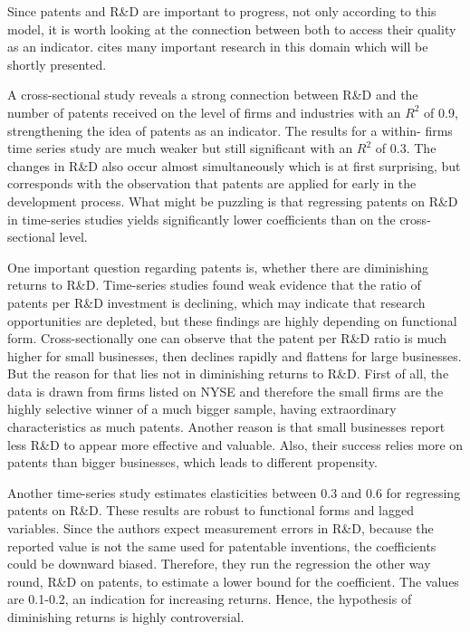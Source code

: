\documentclass[12pt, a4paper, abstract, parskip]{scrartcl}
\theoremstyle{definition}
\begin{document}
Since patents and R\&D are important to progress, not only according to this
model, it is worth looking at the connection between both to access their
quality as an indicator. \cite{griliches1990patent} cites many important
research in this domain which will be shortly presented.

A cross-sectional study reveals a strong connection between R\&D and the number
of patents received on the level of firms and industries with an $R^2$ of 0.9,
strengthening the idea of patents as an indicator. The results for a within-
firms time series study are much weaker but still significant with an $R^2$ of
0.3. The changes in R\&D also occur almost simultaneously which is at first
surprising, but corresponds with the observation that patents are applied for
early in the development process. What might be puzzling is that regressing
patents on R\&D in time-series studies yields significantly lower coefficients
than on the cross-sectional level.

One important question regarding patents is, whether there are diminishing
returns to R\&D. Time-series studies found weak evidence that the ratio of
patents per R\&D investment is declining, which may indicate that research
opportunities are depleted, but these findings are highly depending on
functional form. Cross-sectionally one can observe that the patent per R\&D
ratio is much higher for small businesses, then declines rapidly and flattens
for large businesses. But the reason for that lies not in diminishing returns
to R\&D. First of all, the data is drawn from firms listed on NYSE and
therefore the small firms are the highly selective winner of a much bigger
sample, having extraordinary characteristics as much patents. Another reason is
that small businesses report less R\&D to appear more effective and valuable.
Also, their success relies more on patents than bigger businesses, which leads
to different propensity.

Another time-series study estimates elasticities between 0.3 and 0.6 for
regressing patents on R\&D. These results are robust to functional forms and
lagged variables. Since the authors expect measurement errors in R\&D, because
the reported value is not the same used for patentable inventions, the
coefficients could be downward biased. Therefore, they run the regression the
other way round, R\&D on patents, to estimate a lower bound for the
coefficient. The values are 0.1-0.2, an indication for increasing returns.
Hence, the hypothesis of diminishing returns is highly controversial.
\end{document}
